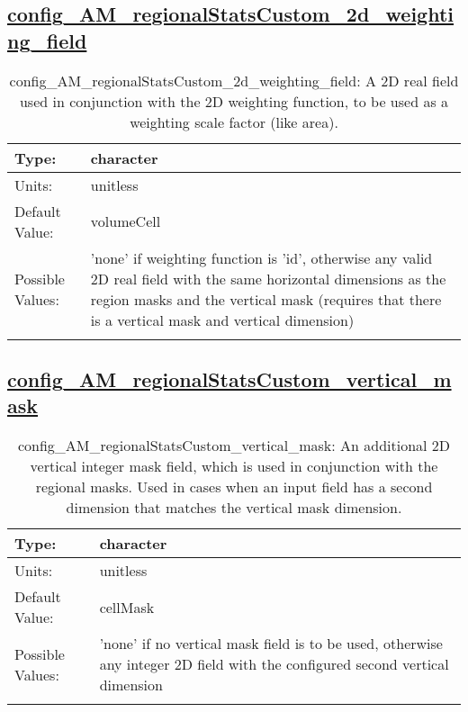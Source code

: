 \subsection[config\_AM\_regionalStatsCustom\_2d\_weighting\_field]{\hyperref[sec:nm_tab_AM_regionalStatsCustom]{config\_AM\_regionalStatsCustom\_2d\_weighting\_field}}
\label{subsec:nm_sec_config_AM_regionalStatsCustom_2d_weighting_field}
\begin{center}
\begin{longtable}{| p{2.0in} || p{4.0in} |}
    \hline
    Type: & character \\
    \hline
    Units: & \si{unitless} \\
    \hline
    Default Value: & volumeCell \\
    \hline
    Possible Values: & 'none' if weighting function is 'id', otherwise any valid 2D real field with the same horizontal dimensions as the region masks and the vertical mask (requires that there is a vertical mask and vertical dimension) \\
    \hline
    \caption{config\_AM\_regionalStatsCustom\_2d\_weighting\_field: A 2D real field used in conjunction with the 2D weighting function, to be used as a weighting scale factor (like area).}
\end{longtable}
\end{center}
\subsection[config\_AM\_regionalStatsCustom\_vertical\_mask]{\hyperref[sec:nm_tab_AM_regionalStatsCustom]{config\_AM\_regionalStatsCustom\_vertical\_mask}}
\label{subsec:nm_sec_config_AM_regionalStatsCustom_vertical_mask}
\begin{center}
\begin{longtable}{| p{2.0in} || p{4.0in} |}
    \hline
    Type: & character \\
    \hline
    Units: & \si{unitless} \\
    \hline
    Default Value: & cellMask \\
    \hline
    Possible Values: & 'none' if no vertical mask field is to be used, otherwise any integer 2D field with the configured second vertical dimension \\
    \hline
    \caption{config\_AM\_regionalStatsCustom\_vertical\_mask: An additional 2D vertical integer mask field, which is used in conjunction with the regional masks. Used in cases when an input field has a second dimension that matches the vertical mask dimension.}
\end{longtable}
\end{center}
